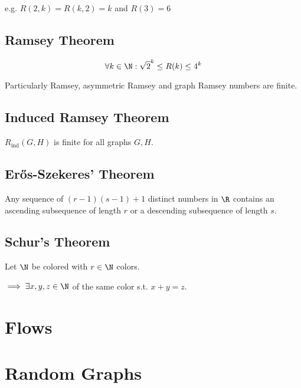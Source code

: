 e.g. $R(2,k) = R(k,2) = k$ and $R(3) = 6$

\subsection*{Ramsey Theorem}

$$\forall k \in \N : \sqrt{2}^k \leq R(k) \leq 4^k$$

Particularly Ramsey, asymmetric Ramsey and graph Ramsey numbers are finite.

\subsection*{Induced Ramsey Theorem}

$R_\text{ind}(G,H)$ is finite for all graphs $G, H$.

\subsection*{Er\H{o}s-Szekeres' Theorem}

Any sequence of $(r-1)(s-1)+1$ distinct numbers in $\R$ contains an ascending subsequence of length $r$ or a descending subsequence of length $s$.

\subsection*{Schur's Theorem}

Let $\N$ be colored with $r \in \N$ colors.

$\implies \exists x, y, z \in \N$ of the same color s.t. $x+y=z$.

\section*{Flows}

\section*{Random Graphs}
